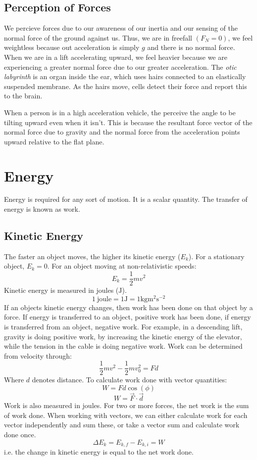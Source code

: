 \documentclass[12pt]{report}
\begin{document}
\begin{flushleft}
\subsection*{Perception of Forces}
We percieve forces due to our awareness of our inertia and our sensing of the
normal force of the ground against us. Thus, we are in freefall \((F_N = 0)\),
we feel weightless because out acceleration is simply \(g\) and there is no 
normal force. When we are in a lift accelerating upward, we feel heavier 
because we are experiencing a greater normal force due to our greater 
acceleration. The \textit{otic labyrinth} is an organ inside the ear, 
which uses hairs connected to an elastically suspended membrane. As the hairs 
move, cells detect their force and report this to the brain.

\bigskip
When a person is in a high acceleration vehicle, the perceive the angle to be
tilting upward even when it isn't. This is because the resultant force vector 
of the normal force due to gravity and the normal force from the acceleration
points upward relative to the flat plane.

\section*{Energy}
Energy is required for any sort of motion. It is a scalar quantity. The 
transfer of energy is known as work.

\subsection*{Kinetic Energy}
The faster an object moves, the higher its kinetic energy (\(E_k\)). For a 
stationary object, \(E_k = 0\). For an object moving at non-relativistic 
speeds:
\[E_k = \frac{1}{2}mv^2\]
Kinetic energy is measured in joules (\(\mathrm{J}\)).
\[1 \:\mathrm{joule} = 1\mathrm{J} = 1\mathrm{kg}\mathrm{m}^2\mathrm{s}^{-2}\]
If an objects kinetic energy changes, then work has been done on that object by
a force. If energy is transferred to an object, positive work has been done, if
energy is transferred from an object, negative work. For example, in a 
descending lift, gravity is doing positive work, by increasing the kinetic 
energy of the elevator, while the tension in the cable is doing negative work.
Work can be determined from velocity through:
\[\frac{1}{2}mv^2 - \frac{1}{2}mv_0^2 = Fd\]
Where \(d\) denotes distance. To calculate work done with vector quantities:
\[W = Fd\cos(\phi)\]
\[W = \vec{F}\cdot\vec{d}\]
Work is also measured in joules. For two or more forces, the net work is the
sum of work done. When working with vectors, we can either calculate work for 
each vector independently and sum these, or take a vector sum and calculate 
work done once.
\[\Delta E_k = E_{k,f} - E_{k,i} = W\]
i.e. the change in kinetic energy is equal to the net work done.


\end{flushleft}
\end{document}
